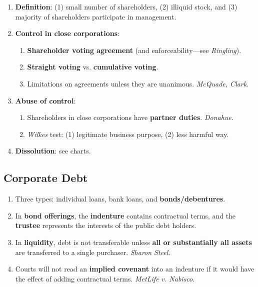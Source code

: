 \begin{enumerate}
    \item \textbf{Definition}: (1) small number of shareholders, (2) illiquid 
    stock, and (3) majority of shareholders participate in management. 
    \item \textbf{Control in close corporations}:
    \begin{enumerate}
        \item \textbf{Shareholder voting agreement} (and enforceability---see 
        \emph{Ringling}).
        \item \textbf{Straight voting} vs. \textbf{cumulative voting}.
        \item Limitations on agreements unless they are unanimous. 
        \emph{McQuade, Clark}.
    \end{enumerate}
    \item \textbf{Abuse of control}:
    \begin{enumerate}
        \item Shareholders in close corporations have \textbf{partner duties}. 
        \emph{Donahue}.
        \item \emph{Wilkes} test: (1) legitimate business purpose, (2) less 
        harmful way.
    \end{enumerate}
    \item \textbf{Dissolution}: see charts.
\end{enumerate}

\newpage

\subsection{Corporate Debt}

\begin{enumerate}
    \item Three types: individual loans, bank loans, and 
    \textbf{bonds/debentures}.
    \item In \textbf{bond offerings}, the \textbf{indenture} contains 
    contractual terms, and the \textbf{trustee} represents the interests of 
    the public debt holders.
    \item In \textbf{liquidity}, debt is not transferable unless \textbf{all 
    or substantially all assets} are transferred to a single purchaser. 
    \emph{Sharon Steel}.
    \item Courts will not read an \textbf{implied covenant} into an indenture 
    if it would have the effect of adding contractual terms. \emph{MetLife v. 
    Nabisco}.
\end{enumerate}

